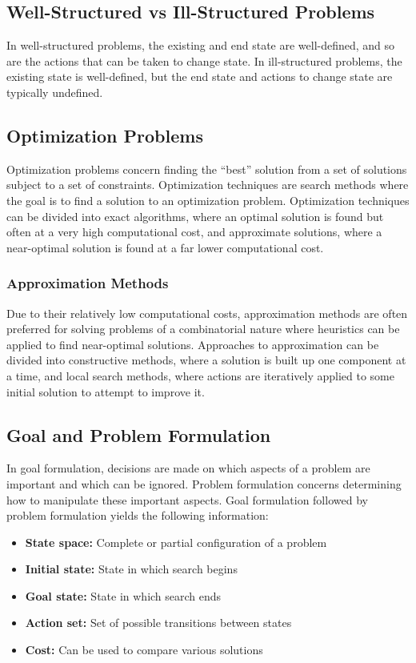 \documentclass[12pt,titlepage]{article}
\begin{document}
    \subsection{Well-Structured vs Ill-Structured Problems}
      In well-structured problems, the existing and end state are well-defined, and so are the actions that can be taken
      to change state. In ill-structured problems, the existing state is well-defined, but the end state and actions to
      change state are typically undefined.

    \subsection{Optimization Problems}
      Optimization problems concern finding the ``best'' solution from a set of solutions subject to a set of constraints.
      Optimization techniques are search methods where the goal is to find a solution to an optimization problem. Optimization
      techniques can be divided into exact algorithms, where an optimal solution is found but often at a very high computational
      cost, and approximate solutions, where a near-optimal solution is found at a far lower computational cost.

      \subsubsection{Approximation Methods}
        Due to their relatively low computational costs, approximation methods are often preferred for solving problems of a
        combinatorial nature where heuristics can be applied to find near-optimal solutions. Approaches to approximation can
        be divided into constructive methods, where a solution is built up one component at a time, and local search methods,
        where actions are iteratively applied to some initial solution to attempt to improve it.

    \subsection{Goal and Problem Formulation}
      In goal formulation, decisions are made on which aspects of a problem are important and which can be ignored. Problem
      formulation concerns determining how to manipulate these important aspects. Goal formulation followed by problem
      formulation yields the following information:
      \begin{itemize}
        \item \textbf{State space:} Complete or partial configuration of a problem
        \item \textbf{Initial state:} State in which search begins
        \item \textbf{Goal state:} State in which search ends
        \item \textbf{Action set:} Set of possible transitions between states
        \item \textbf{Cost:} Can be used to compare various solutions
      \end{itemize}
\end{document}
